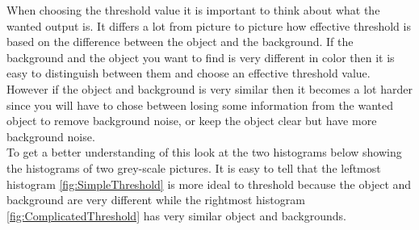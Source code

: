 When choosing the threshold value it is important to think about what the wanted output is. It differs a lot from picture to picture how effective threshold is based on the difference between the object and the background. If the background and the object you want to find is very different in color then it is easy to distinguish between them and choose an effective threshold value. However if the object and background is very similar then it becomes a lot harder since you will have to chose between losing some information from the wanted object to remove background noise, or keep the object clear but have more background noise. \\
To get a better understanding of this look at the two histograms below showing the histograms of two grey-scale pictures. It is easy to tell that the leftmost histogram \eqref{fig:SimpleThreshold} is more ideal to threshold because the object and background are very different while the rightmost histogram \eqref{fig:ComplicatedThreshold} has very similar object and backgrounds.

